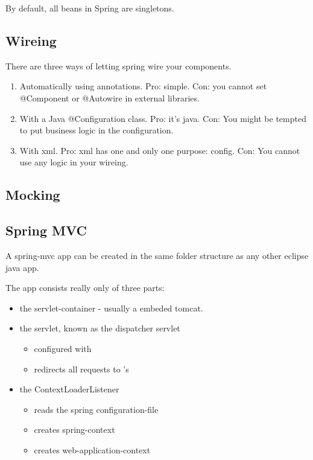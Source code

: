 By default, all beans in Spring are singletons.

\subsection{Wireing}

There are three ways of letting spring wire your components. 
\begin{enumerate}
\item Automatically using annotations. Pro: simple. Con: you cannot set @Component or @Autowire in external libraries.
\item With a Java @Configuration class. Pro: it's java. Con: You might be tempted to put business logic in the configuration. 
\item With xml. Pro: xml has one and only one purpose: config. Con: You cannot use any logic in your wireing.
\end{enumerate}


\subsection{Mocking}



\subsection{Spring MVC}

A spring-mvc app can be created in the same folder structure as any other eclipse java app.

The app consists really only of three parts: 
\begin{itemize}
    \item the servlet-container - usually a embeded tomcat. 
    \item the servlet, known as the dispatcher servlet
        \begin{itemize}
            \item configured with 
            \item redirects all requests to 's
        \end{itemize}
    \item the ContextLoaderListener
        \begin{itemize}
            \item reads the spring configuration-file
            \item creates spring-context
            \item creates web-application-context
        \end{itemize}
\end{itemize}

